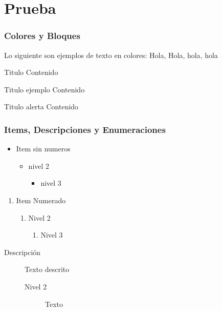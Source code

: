\documentclass[aspectratio=43]{beamer}%
\newcommand\rojo[1]{\textcolor[RGB]{237,41,57}{#1}}
\newcommand\azul[1]{\textcolor[RGB]{19,15,204}{#1}}
\newcommand\verde[1]{\textcolor[RGB]{5,101,99}{#1}}
\newcommand\naranjo[1]{\textcolor[RGB]{251,79,20}{#1}}
\begin{document}
\section{Prueba}
\begin{frame}[fragile]
\frametitle{\textbf{Colores y Bloques}}

 Lo siguiente son ejemplos de texto en colores: \rojo{Hola}, \verde{Hola}, \azul{hola}, \naranjo{hola}
 
 \begin{block}{Titulo}
Contenido
\end{block}


\begin{exampleblock}{Titulo ejemplo}
Contenido
\end{exampleblock}


\begin{alertblock}{Titulo alerta}
Contenido
\end{alertblock}
\end{frame}


\begin{frame}[fragile]
\frametitle{\textbf{Items, Descripciones y Enumeraciones}}
\justifying
\transdissolve
  \begin{itemize}
  \item Item sin numeros
    \begin{itemize}
  \item nivel 2
    \begin{itemize}
    \item nivel 3
    \end{itemize}
  \end{itemize}
\end{itemize}

\begin{enumerate}
  \item Item Numerado
    \begin{enumerate}
     \item Nivel 2
    \begin{enumerate}
      \item Nivel 3
    \end{enumerate}
  \end{enumerate}
\end{enumerate}

\begin{description}
  \item[Descripción] Texto descrito
  \begin{description}
  \item[Nivel 2] Texto
\end{description}

\end{description}
\end{frame}
\end{document}
